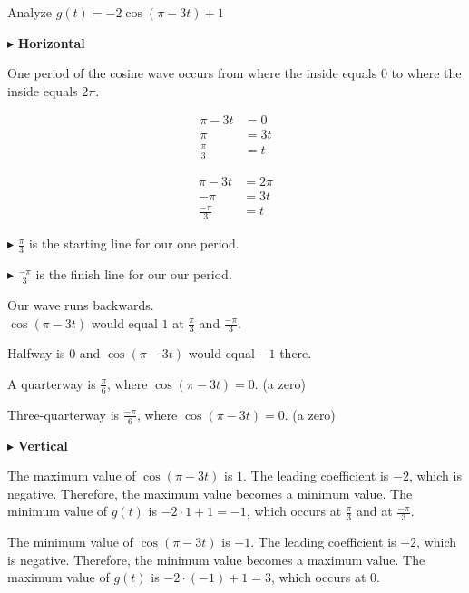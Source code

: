 \documentclass{ximera}
\begin{document}
\begin{example}



Analyze  $g(t) = -2 \cos(\pi - 3t) + 1$


\begin{explanation}

$\blacktriangleright$ \textbf{Horizontal}


One period of the cosine wave occurs from where the inside equals $0$ to where the inside equals $2 \pi$.


\begin{align*}
\pi - 3t  & =  0 \\
\pi       & =  3t \\
\frac{\pi}{3}       & =  t
\end{align*}



\begin{align*}
\pi - 3t  & =  2 \pi \\
-\pi      & =  3t \\
\frac{-\pi}{3}       & =  t
\end{align*}



$\blacktriangleright$ $\frac{\pi}{3}$ is the starting line for our one period.

$\blacktriangleright$ $\frac{-\pi}{3}$ is the finish line for our our period.

Our wave runs backwards. \\




$\cos(\pi - 3t)$ would equal $1$ at $\frac{\pi}{3}$ and $\frac{-\pi}{3}$. 

Halfway is $0$ and $\cos(\pi - 3t)$ would equal $-1$ there.

A quarterway is $\frac{\pi}{6}$, where $\cos(\pi - 3t) = 0$.  (a zero)

Three-quarterway is $\frac{-\pi}{6}$, where $\cos(\pi - 3t) = 0$. (a zero)






$\blacktriangleright$ \textbf{Vertical}


The maximum value of $\cos(\pi - 3t)$ is $1$.  The leading coefficient is $-2$, which is negative.  Therefore, the maximum value becomes a minimum value. The minimum value of $g(t)$ is $-2 \cdot 1 + 1 = -1$, which occurs at $\frac{\pi}{3}$ and at $\frac{-\pi}{3}$. 




The minimum value of $\cos(\pi - 3t)$ is $-1$.  The leading coefficient is $-2$, which is negative.   Therefore, the minimum value becomes a maximum value.  The maximum value of $g(t)$ is $-2 \cdot (-1) + 1 = 3$, which occurs at $0$. 









\end{explanation}
\end{example}
\end{document}
